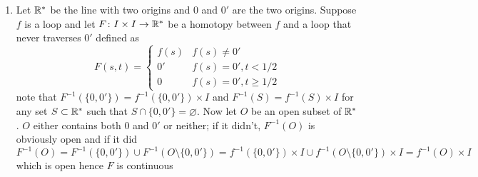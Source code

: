 \documentclass{article}
\begin{document}
\begin{homeworkProblem}
    \begin{enumerate}
        \item Let $\mathbb{R}^*$ be the line with two origins and $0$ and $0'$ are the two origins. Suppose $f$ is a loop and let $F\colon I \times I \to \mathbb{R}^*$ be a homotopy between $f$ and a loop that never traverses $0'$ defined as
        \[F(s, t) = 
        \begin{cases}
            f(s) & f(s) \neq 0' \\
            0' & f(s) = 0', t<1/2 \\
            0 & f(s) = 0', t\geq 1/2
        \end{cases}\]
        note that $F^{-1}(\{0, 0'\}) = f^{-1}(\{0, 0'\}) \times I$ and $F^{-1}(S) = f^{-1}(S) \times I$ for any set $S \subset \mathbb{R}^*$ such that $S \cap \{0, 0'\} = \varnothing$. Now let $O$ be an open subset of $\mathbb{R}^*$. $O$ either contains both $0$ and $0'$ or neither; if it didn't, $F^{-1}(O)$ is obviously open and if it did
        \[F^{-1}(O) = F^{-1}(\{0, 0'\}) \cup F^{-1}(O \setminus \{0, 0'\}) = f^{-1}(\{0, 0'\}) \times I \cup f^{-1}(O \setminus \{0, 0'\}) \times I = f^{-1}(O) \times I\]
        which is open hence $F$ is continuous
    \end{enumerate}
\end{homeworkProblem}
\end{document}
